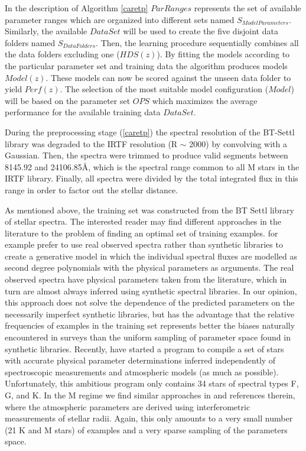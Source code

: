 In the description of Algorithm \ref{caretp} $ParRanges$ represents
the set of available parameter ranges which are organized into
different sets named $S_{ModelParameters}$.  Similarly, the available
$DataSet$ will be used to create the five disjoint data folders named
$S_{DataFolders}$. Then, the learning procedure sequentially combines
all the data folders excluding one ($HDS(z)$).  By fitting the models
according to the particular parameter set and training data the
algorithm produces models $Model(z)$. These models can now be scored
against the unseen data folder to yield $Perf(z)$.  The selection of
the most suitable model configuration ($Model$) will be based on the
parameter set $OPS$ which maximizes the average performance for the
available training data $DataSet$.


During the preprocessing stage (\ref{caretp}) the
spectral resolution of the BT-Settl library was degraded to the IRTF
resolution (R $\sim$ 2000) by convolving with a Gaussian. Then, the spectra
were trimmed to produce valid segments between 8145.92 and
24106.85{\AA}, which is the spectral range common to all M stars in
the IRTF library. Finally, all spectra were divided by the total
integrated flux in this range in order to factor out the stellar
distance.


As mentioned above, the training set was constructed from the BT Settl
library of stellar spectra. The interested reader may find different
approaches in the literature to the problem of finding an optimal set
of training examples. \cite{hoggCannon} for example prefer to use real
observed spectra rather than synthetic libraries to create a
generative model in which the individual spectral fluxes are modelled
as second degree polynomials with the physical parameters as
arguments. The real observed spectra have physical parameters taken
from the literature, which in turn are almost always inferred using
synthetic spectral libraries. In our opinion, this approach does not
solve the dependence of the predicted parameters on the necessarily
imperfect synthetic libraries, but has the advantage that the relative
frequencies of examples in the training set represents better the
biases naturally encountered in surveys than the uniform sampling of
parameter space found in synthetic libraries. Recently, \cite{heiter}
have started a program to compile a set of stars with accurate
physical parameter determinations inferred independently of
spectroscopic measurements and atmospheric models (as much as
possible). Unfortunately, this ambitious program only contains 34
stars of spectral types F, G, and K. In the M regime we find similar
approaches in \cite{2014AJ....147...47B} and references therein, where
the atmospheric parameters are derived using interferometric
measurements of stellar radii. Again, this only amounts to a very
small number (21 K and M stars) of examples and a very sparse sampling
of the parameters space.

